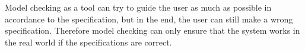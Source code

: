 Model checking as a tool can try to guide the user as much as possible in accordance to the specification, but in the end, the user can still make a wrong specification. Therefore model checking can only ensure that the system works in the real world if the specifications are correct.


